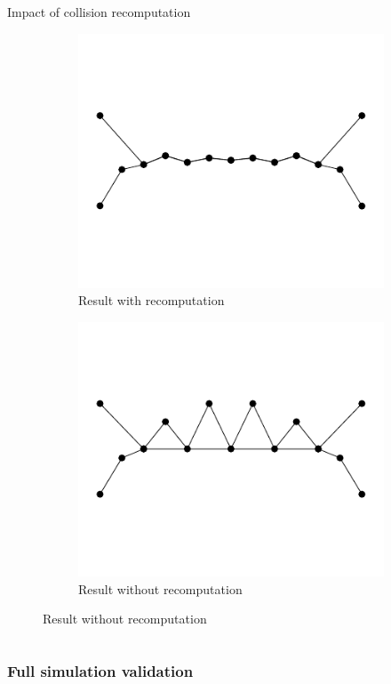 \documentclass[aspectratio=1610,t,10pt]{beamer}
\begin{document}
\begin{frame}
\begin{columns}[t]
\begin{column}{.48\textwidth}
\begin{block}{Impact of collision recomputation}
\begin{figure}
			\begin{subfigure}[t]{0.48\textwidth}
				\centering
				\includegraphics[width=0.8\linewidth]{img/res-collision/disloc-plot-3}
				\caption{Result with recomputation}
			\end{subfigure}
			\begin{subfigure}[t]{0.48\textwidth}
				\centering
				\includegraphics[width=0.8\linewidth]{img/res-collision/disloc-plot-4}
				\caption{Result without recomputation}
			\end{subfigure}
		\end{figure}
		\end{block}
	\end{column}
\end{columns}
\end{frame}

\subsubsection{Full simulation validation}
\end{document}

